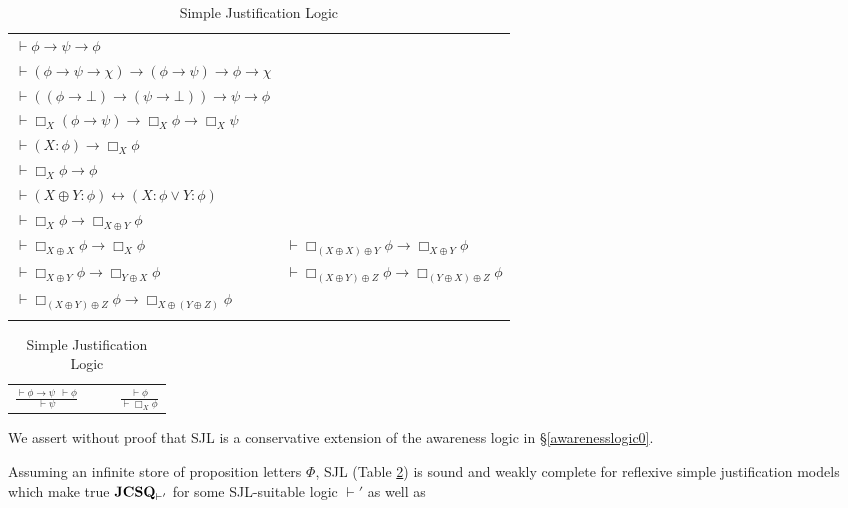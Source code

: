 \begin{table}[h]
\begin{centering}
  \begin{tabular}{ll}
    $\vdash \phi \rightarrow \psi \rightarrow \phi$ & \\
    $\vdash (\phi \rightarrow \psi \rightarrow \chi) \rightarrow (\phi
    \rightarrow \psi) \rightarrow \phi \rightarrow \chi$ & \\
    $\vdash ((\phi \rightarrow \bot) \rightarrow (\psi \rightarrow \bot))
    \rightarrow \psi \rightarrow \phi$ & \\
    $\vdash \Box_X (\phi \rightarrow \psi) \rightarrow \Box_X \phi \rightarrow
    \Box_X \psi$ & \\
    $\vdash (X : \phi) \rightarrow \Box_X \phi$ & \\
    $\vdash \Box_X \phi \rightarrow \phi$ & \\
    $\vdash (X \oplus Y : \phi) \leftrightarrow (X : \phi \vee Y :
    \phi)$ & \\
    $\vdash \Box_X \phi \rightarrow \Box_{X \oplus Y} \phi$ & \\
    $\vdash \Box_{X \oplus X} \phi \rightarrow \Box_X \phi$ & $\vdash \Box_{(X
    \oplus X) \oplus Y} \phi \rightarrow \Box_{X \oplus Y} \phi$ \\
    $\vdash \Box_{X \oplus Y} \phi \rightarrow \Box_{Y \oplus X} \phi$ &
    $\vdash \Box_{(X \oplus Y) \oplus Z} \phi \rightarrow \Box_{(Y \oplus X)
    \oplus Z} \phi$\\
    $\vdash \Box_{(X \oplus Y) \oplus Z} \phi \rightarrow \Box_{X \oplus (Y
    \oplus Z)} \phi$ & \\
    & 
  \end{tabular}
\begin{tabular}{lll}
      $\displaystyle\frac{\vdash \phi \rightarrow \psi \ \  \vdash \phi}{\vdash
      \psi}$ & {\ \ } & $\displaystyle\frac{\vdash \phi}{\vdash \Box_X \phi}$
    \end{tabular}
  \caption{\label{logic5}Simple Justification Logic}
\end{centering}
\end{table}
We assert without proof that SJL is a conservative extension of the awareness logic in
{\S}\ref{awarenesslogic0}.

\begin{theorem}
  \label{completeness5}Assuming an infinite store of proposition letters
  $\Phi$, SJL (Table \ref{logic5}) is sound and weakly complete for reflexive simple justification models
  which make true $\textup{{\bfseries{JCSQ}}}_{\vdash'}$ for some
  SJL-suitable logic $\vdash'$ as well as
\end{theorem}


